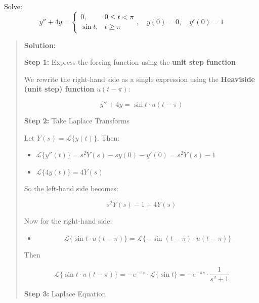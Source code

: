 \documentclass[
  letterpaper,
  DIV=11,
  numbers=noendperiod]{scrreprt}
\providecommand{\tightlist}{%
  \setlength{\itemsep}{0pt}\setlength{\parskip}{0pt}}
\theoremstyle{plain}
\theoremstyle{remark}
\begin{document}
\begin{tcolorbox}[enhanced jigsaw, title=\textcolor{quarto-callout-tip-color}{\faLightbulb}\hspace{0.5em}{Example}, colbacktitle=quarto-callout-tip-color!10!white, opacitybacktitle=0.6, opacityback=0, rightrule=.15mm, breakable, titlerule=0mm, colback=white, bottomtitle=1mm, colframe=quarto-callout-tip-color-frame, toprule=.15mm, leftrule=.75mm, toptitle=1mm, arc=.35mm, bottomrule=.15mm, left=2mm, coltitle=black]

Solve: \[
y'' + 4y = 
\begin{cases}
0, & 0 \le t < \pi \\
\sin t, & t \ge \pi
\end{cases}, \quad y(0) = 0, \quad y'(0) = 1
\]

\begin{quote}
\textbf{Solution:}

\textbf{Step 1:} Express the forcing function using the \textbf{unit
step function}

We rewrite the right-hand side as a single expression using the
\textbf{Heaviside (unit step) function} \(u(t - \pi)\):

\[
y'' + 4y = \sin t \cdot u(t - \pi)
\]

\textbf{Step 2:} Take Laplace Transforms

Let \(Y(s) = \mathcal{L}\{y(t)\}\). Then:

\begin{itemize}
\tightlist
\item
  \(\mathcal{L}\{y''(t)\} = s^2 Y(s) - s y(0) - y'(0) = s^2 Y(s) - 1\)
\item
  \(\mathcal{L}\{4y(t)\} = 4Y(s)\)
\end{itemize}

So the left-hand side becomes:

\[
s^2 Y(s) - 1 + 4Y(s)
\]

Now for the right-hand side:

\begin{itemize}
\tightlist
\item
  \[\mathcal{L}\{\sin t \cdot u(t - \pi)\} = \mathcal{L}\{-\sin(t-\pi) \cdot u(t - \pi)\}\]
\end{itemize}

Then

\[
\mathcal{L}\{\sin t \cdot u(t - \pi)\} = -e^{-\pi s} \cdot \mathcal{L}\{\sin t\} = -e^{-\pi s} \cdot \frac{1}{s^2 + 1}
\]

\textbf{Step 3:} Laplace Equation


\end{quote}
\end{tcolorbox}
\end{document}
